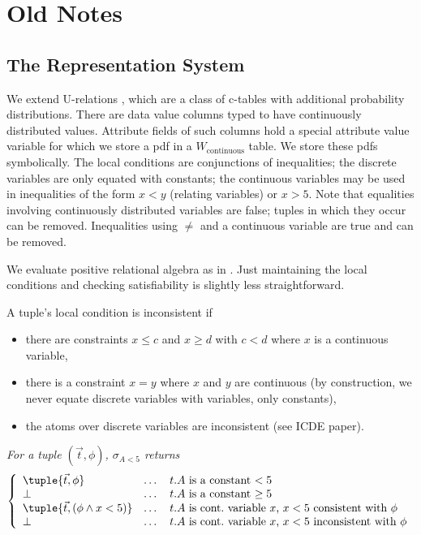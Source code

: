 \section{Old Notes}


\subsection{The Representation System}


We extend U-relations \cite{AJKO2008}, which are a class of c-tables
with additional probability distributions. 
There are data value columns typed to have continuously distributed values.
Attribute fields of such columns hold a special attribute value variable
for which we store a pdf in a $W_{\mathrm{continuous}}$ table. We store
these pdfs symbolically.
The local conditions are conjunctions of inequalities; the discrete variables
are only equated with constants; the continuous variables may be used in
inequalities of the form $x<y$ (relating variables) or $x>5$. Note that
equalities involving continuously distributed variables are false; tuples in
which they occur can be
removed. Inequalities using $\neq$ and a continuous variable are true and can
be removed.

We evaluate positive relational algebra as in \cite{AJKO2008}. Just maintaining
the local conditions and checking satisfiability is slightly less
straightforward.

A tuple's local condition is inconsistent if
\begin{itemize}
\item
there are constraints $x \le c$ and $x \ge d$ with $c < d$
where $x$ is a continuous variable,

\item
there is a constraint $x = y$ where $x$ and $y$ are
continuous (by construction, we never equate discrete variables with
variables, only constants),

\item
the atoms over discrete variables are inconsistent (see ICDE paper).
\end{itemize}


\begin{example}
\em
%
For a tuple $(\vec{t}, \phi)$, $\sigma_{A<5}$ returns
\[
\left\{
\begin{array}{lll}
\tuple{\vec{t}, \phi} & \dots & \mbox{$t.A$ is a constant $< 5$} \\
\bot            & \dots & \mbox{$t.A$ is a constant $\ge 5$} \\
\tuple{\vec{t}, (\phi \land x < 5)} & \dots &
   \mbox{$t.A$ is cont.\ variable $x$,
         $x < 5$ consistent with $\phi$} \\
\bot & \dots & \mbox{$t.A$ is cont.\ variable $x$,
                     $x < 5$ inconsistent with $\phi$}
\end{array}
\right.
\]
%
\punto
\end{example}



